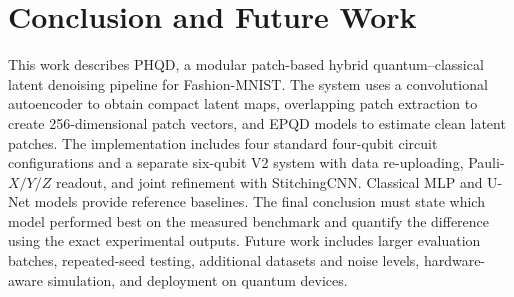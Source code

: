\documentclass[runningheads]{llncs}
\begin{document}
\section{Conclusion and Future Work}
This work describes PHQD, a modular patch-based hybrid quantum--classical latent denoising pipeline for Fashion-MNIST. The system uses a convolutional autoencoder to obtain compact latent maps, overlapping patch extraction to create 256-dimensional patch vectors, and EPQD models to estimate clean latent patches. The implementation includes four standard four-qubit circuit configurations and a separate six-qubit V2 system with data re-uploading, Pauli-$X/Y/Z$ readout, and joint refinement with StitchingCNN. Classical MLP and U-Net models provide reference baselines. The final conclusion must state which model performed best on the measured benchmark and quantify the difference using the exact experimental outputs. Future work includes larger evaluation batches, repeated-seed testing, additional datasets and noise levels, hardware-aware simulation, and deployment on quantum devices.
\end{document}
